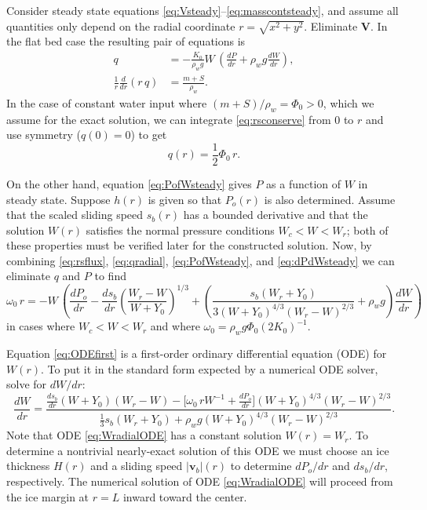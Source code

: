 \documentclass[11pt,final]{amsart}%
\newcommand\bv{\mathbf{v}}
\newcommand\bV{\mathbf{V}}
\begin{document}
Consider steady state equations \eqref{eq:Vsteady}--\eqref{eq:masscontsteady}, and assume all quantities only depend on the radial coordinate $r = \sqrt{x^2+y^2}$.  Eliminate $\bV$.  In the flat bed case the resulting pair of equations is
\begin{align}
q &= - \frac{K_0}{\rho_w g} W\, \left(\frac{dP}{dr} + \rho_w g \frac{dW}{dr}\right), \label{eq:rsflux} \\
\frac{1}{r}\frac{d}{dr}\left(r\,q\right) &= \frac{m+S}{\rho_w}. \label{eq:rsconserve}
\end{align}
In the case of constant water input where $(m+S)/\rho_w=\Phi_0 > 0$, which we assume for the exact solution, we can integrate \eqref{eq:rsconserve} from $0$ to $r$ and use symmetry ($q(0)=0$) to get
\begin{equation}
q(r) = \frac{1}{2} \Phi_0\, r. \label{eq:qradial}
\end{equation}

On the other hand, equation \eqref{eq:PofWsteady} gives $P$ as a function of $W$ in steady state.  Suppose $h(r)$ is given so that $P_o(r)$ is also determined.  Assume that the scaled sliding speed $s_b(r)$ has a bounded derivative and that the solution $W(r)$ satisfies the normal pressure conditions $W_c < W < W_r$; both of these properties must be verified later for the constructed solution.  Now, by combining \eqref{eq:rsflux}, \eqref{eq:qradial}, \eqref{eq:PofWsteady}, and \eqref{eq:dPdWsteady} we can eliminate $q$ and $P$ to find
\begin{equation}
\omega_0\, r = - W\, \left(\frac{dP_o}{dr} - \frac{ds_b}{dr} \left(\frac{W_r - W}{W+Y_0}\right)^{1/3} + \left(\frac{s_b (W_r + Y_0)}{3 (W+Y_0)^{4/3} (W_r - W)^{2/3}} + \rho_w g\right) \frac{dW}{dr}\right)  \label{eq:ODEfirst}
\end{equation}
in cases where $W_c < W < W_r$ and where $\omega_0 = \rho_w g \Phi_0 (2 K_0)^{-1}$. 

Equation \eqref{eq:ODEfirst} is a first-order ordinary differential equation (ODE) for $W(r)$.  To put it in the standard form expected by a numerical ODE solver, solve for $dW/dr$:
\begin{equation}
\frac{dW}{dr} = \frac{\frac{ds_b}{dr} (W+Y_0) (W_r - W) - \Big[\omega_0\, r W^{-1} + \frac{dP_o}{dr}\Big] (W + Y_0)^{4/3} \left(W_r - W\right)^{2/3}}{\frac{1}{3} s_b (W_r + Y_0) + \rho_w g (W + Y_0)^{4/3} (W_r - W)^{2/3}}.
\label{eq:WradialODE}
\end{equation}
Note that ODE \eqref{eq:WradialODE} has a constant solution $W(r)=W_r$.  To determine a nontrivial nearly-exact solution of this ODE we must choose an ice thickness $H(r)$ and a sliding speed $|\bv_b|(r)$ to determine $dP_o/dr$ and $ds_b/dr$, respectively.  The numerical solution of ODE \eqref{eq:WradialODE} will proceed from the ice margin at $r=L$ inward toward the center.
\end{document}
